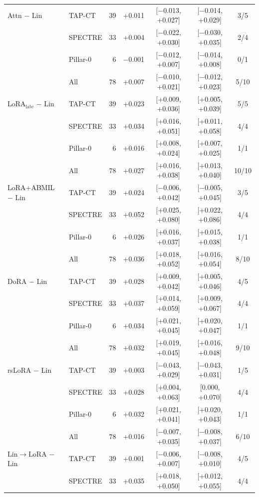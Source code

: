 \begin{tabular}{@{}llrrccc@{}}
\addlinespace[2pt]
Attn $-$ Lin & TAP-CT & 39 & +0.011 & [$-$0.013, +0.027] & [$-$0.014, +0.029] & 3/5 \\
 & SPECTRE & 33 & +0.004 & [$-$0.022, +0.030] & [$-$0.030, +0.035] & 2/4 \\
 & Pillar-0 & 6 & $-$0.001 & [$-$0.012, +0.007] & [$-$0.014, +0.008] & 0/1 \\
 & All & 78 & +0.007 & [$-$0.010, +0.021] & [$-$0.012, +0.023] & 5/10 \\
\addlinespace[2pt]
LoRA$_{\text{late}}$ $-$ Lin & TAP-CT & 39 & +0.023 & [+0.009, +0.036] & [+0.005, +0.039] & 5/5 \\
 & SPECTRE & 33 & +0.034 & [+0.016, +0.051] & [+0.011, +0.058] & 4/4 \\
 & Pillar-0 & 6 & +0.016 & [+0.008, +0.024] & [+0.007, +0.025] & 1/1 \\
 & All & 78 & +0.027 & [+0.016, +0.038] & [+0.013, +0.040] & 10/10 \\
\addlinespace[2pt]
LoRA+ABMIL $-$ Lin & TAP-CT & 39 & +0.024 & [$-$0.006, +0.042] & [$-$0.005, +0.045] & 3/5 \\
 & SPECTRE & 33 & +0.052 & [+0.025, +0.080] & [+0.022, +0.086] & 4/4 \\
 & Pillar-0 & 6 & +0.026 & [+0.016, +0.037] & [+0.015, +0.038] & 1/1 \\
 & All & 78 & +0.036 & [+0.018, +0.052] & [+0.016, +0.054] & 8/10 \\
\addlinespace[2pt]
DoRA $-$ Lin & TAP-CT & 39 & +0.028 & [+0.009, +0.042] & [+0.005, +0.046] & 4/5 \\
 & SPECTRE & 33 & +0.037 & [+0.014, +0.059] & [+0.009, +0.067] & 4/4 \\
 & Pillar-0 & 6 & +0.034 & [+0.021, +0.045] & [+0.020, +0.047] & 1/1 \\
 & All & 78 & +0.032 & [+0.019, +0.045] & [+0.016, +0.048] & 9/10 \\
\addlinespace[2pt]
rsLoRA $-$ Lin & TAP-CT & 39 & +0.003 & [$-$0.043, +0.029] & [$-$0.043, +0.031] & 1/5 \\
 & SPECTRE & 33 & +0.028 & [+0.004, +0.063] & [0.000, +0.070] & 4/4 \\
 & Pillar-0 & 6 & +0.032 & [+0.021, +0.041] & [+0.020, +0.043] & 1/1 \\
 & All & 78 & +0.016 & [$-$0.007, +0.035] & [$-$0.008, +0.037] & 6/10 \\
\addlinespace[2pt]
Lin$\to$LoRA $-$ Lin & TAP-CT & 39 & +0.001 & [$-$0.006, +0.007] & [$-$0.008, +0.010] & 4/5 \\
 & SPECTRE & 33 & +0.035 & [+0.018, +0.050] & [+0.012, +0.055] & 4/4 \\

\end{tabular}
